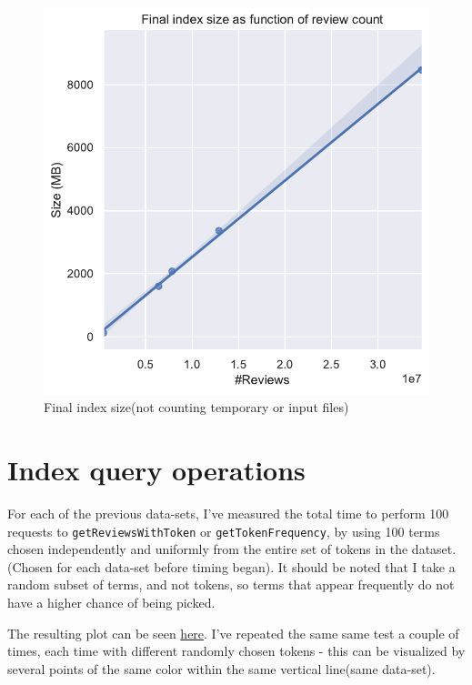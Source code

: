 \documentclass[11pt]{article}
\begin{document}
\begin{figure}[!htb]
	\caption{Final index size(not counting temporary or input files)}
	\label{fig:finalsize}
	\centering
	\includegraphics[width=\textwidth,height=\textheight,keepaspectratio]{diskusage2.pdf}
\end{figure}

\section{Index query operations}

For each of the previous data-sets, I've measured the total time to perform 100 requests to \texttt{getReviewsWithToken} or \texttt{getTokenFrequency}, by using 100 terms chosen independently and uniformly from the entire set of tokens in the dataset.(Chosen for each data-set before timing began). It should be noted that I take a random subset of terms, and not tokens, so terms that appear frequently do not have a higher chance of being picked.


The resulting plot can be seen \hyperref[fig:ops]{here}. I've repeated the same same test a couple of times, each time with different
randomly chosen tokens - this can be visualized by several points of the same color within the same vertical line(same data-set). 
\end{document}
